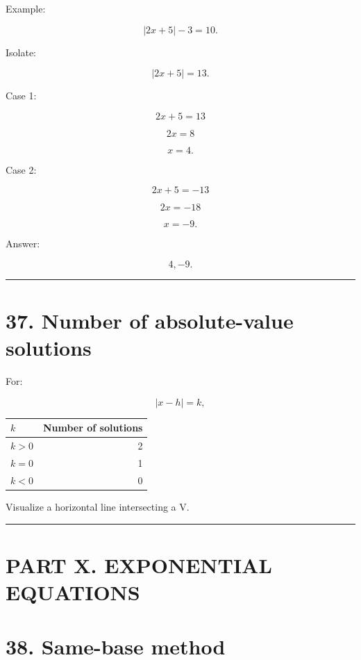 \documentclass[
]{article}
\newcounter{none} %
\begin{document}
Example:

\[
|2x+5|-3=10.
\]

Isolate:

\[
|2x+5|=13.
\]

Case 1:

\[
2x+5=13
\]

\[
2x=8
\]

\[
x=4.
\]

Case 2:

\[
2x+5=-13
\]

\[
2x=-18
\]

\[
x=-9.
\]

Answer:

\[
\boxed{4,-9}.
\]

\begin{center}\rule{0.5\linewidth}{0.5pt}\end{center}

\section{37. Number of absolute-value
solutions}\label{number-of-absolute-value-solutions}

For:

\[
|x-h|=k,
\]

{\def\LTcaptype{none} %
\begin{longtable}[]{@{}lr@{}}
\toprule\noalign{}
\(k\) & Number of solutions \\
\midrule\noalign{}
\endhead
\bottomrule\noalign{}
\endlastfoot
\(k>0\) & 2 \\
\(k=0\) & 1 \\
\(k<0\) & 0 \\
\end{longtable}
}

Visualize a horizontal line intersecting a V.

\begin{center}\rule{0.5\linewidth}{0.5pt}\end{center}

\section{PART X. EXPONENTIAL
EQUATIONS}\label{part-x.-exponential-equations}

\section{38. Same-base method}\label{same-base-method}
\end{document}
